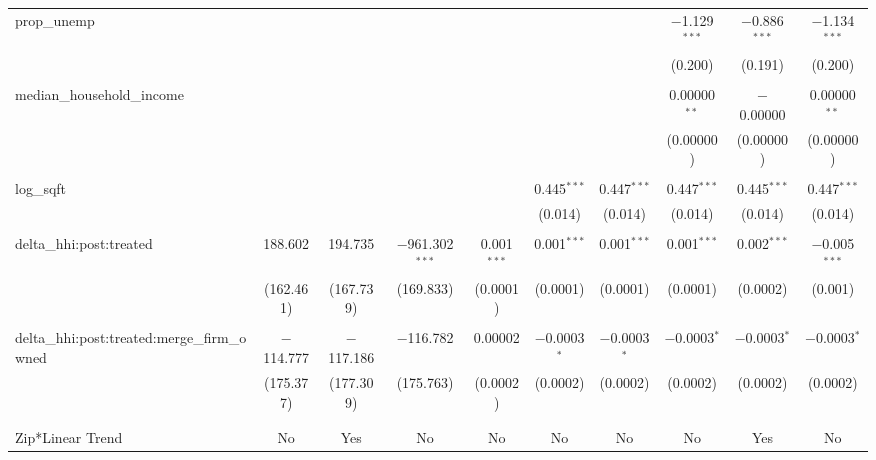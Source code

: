 \begin{table}[H]
{\begin{tabular}{@{\extracolsep{5pt}}lccccccccc}
  prop\_unemp &  &  &  &  &  &  & $-$1.129$^{***}$ & $-$0.886$^{***}$ & $-$1.134$^{***}$ \\  

   &  &  &  &  &  &  & (0.200) & (0.191) & (0.200) \\  

   & & & & & & & & & \\  

  median\_household\_income &  &  &  &  &  &  & 0.00000$^{**}$ & $-$0.00000 & 0.00000$^{**}$ \\  

   &  &  &  &  &  &  & (0.00000) & (0.00000) & (0.00000) \\  

   & & & & & & & & & \\  

  log\_sqft &  &  &  &  & 0.445$^{***}$ & 0.447$^{***}$ & 0.447$^{***}$ & 0.445$^{***}$ & 0.447$^{***}$ \\  

   &  &  &  &  & (0.014) & (0.014) & (0.014) & (0.014) & (0.014) \\  

   & & & & & & & & & \\  

  delta\_hhi:post:treated & 188.602 & 194.735 & $-$961.302$^{***}$ & 0.001$^{***}$ & 0.001$^{***}$ & 0.001$^{***}$ & 0.001$^{***}$ & 0.002$^{***}$ & $-$0.005$^{***}$ \\  

   & (162.461) & (167.739) & (169.833) & (0.0001) & (0.0001) & (0.0001) & (0.0001) & (0.0002) & (0.001) \\  

   & & & & & & & & & \\  

  delta\_hhi:post:treated:merge\_firm\_owned & $-$114.777 & $-$117.186 & $-$116.782 & 0.00002 & $-$0.0003$^{*}$ & $-$0.0003$^{*}$ & $-$0.0003$^{*}$ & $-$0.0003$^{*}$ & $-$0.0003$^{*}$ \\  

   & (175.377) & (177.309) & (175.763) & (0.0002) & (0.0002) & (0.0002) & (0.0002) & (0.0002) & (0.0002) \\  

   & & & & & & & & & \\  

 \hline \\[-1.8ex]  

 Zip*Linear Trend & No & Yes & No & No & No & No & No & Yes & No \\  


\end{tabular}}
\end{table}
